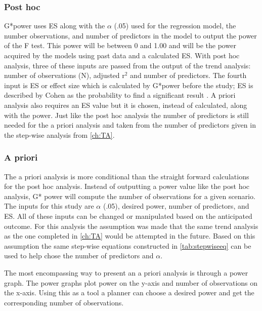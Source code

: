 \subsubsection{Post hoc}

G*power uses ES along with the $\alpha$ (.05) used for the regression model, the number observations, and number of predictors in the model to output the power of the F test.
This power will be between 0 and 1.00 and will be the power acquired by the models using past data and a calculated ES.
With post hoc analysis, three of these inputs are passed from the output of the trend analysis: number of observations (N), adjusted r$^2$ and number of predictors.
The fourth input is ES or effect size which is calculated by G*power before the study; ES is described by Cohen as the probability to find a significant result \citep{cohen1992power}.
A priori analysis also requires an ES value but it is chosen, instead of calculated, along with the power.
Just like the post hoc analysis the number of predictors is still needed for the a priori analysis and taken from the number of predictors given in the step-wise analysis from \autoref{ch:TA}.

\subsubsection{A priori}

The a priori analysis is more conditional than the straight forward calculations for the post hoc analysis.
Instead of outputting a power value like the post hoc analysis, G* power will compute the number of observations for a given scenario. 
The inputs for this study are $\alpha$ (.05), desired power, number of predictors, and ES.
All of these inputs can be changed or manipulated based on the anticipated outcome.
For this analysis the assumption was made that the same trend analysis as the one completed in \autoref{ch:TA} would be attempted in the future.
Based on this assumption the same step-wise equations constructed in \autoref{tab:stepwiseeq} can be used to help chose the number of predictors and $\alpha$.

The most encompassing way to present an a priori analysis is through a power graph.
The power graphs plot power on the y-axis and number of observations on the x-axis.
Using this as a tool a planner can choose a desired power and get the corresponding number of observations.

